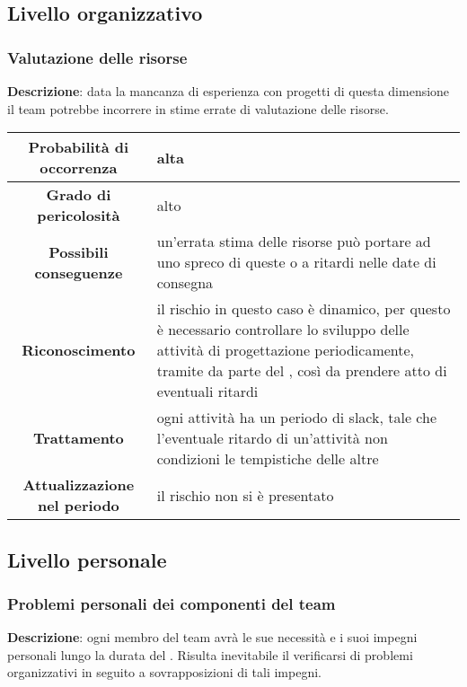 \documentclass[PianoDiProgetto.tex]{subfiles}
\begin{document}
	\subsection{Livello organizzativo}
	\subsubsection{Valutazione delle risorse}
		\label{sec:lo}
		
		\textbf{Descrizione}: data la mancanza di esperienza con progetti di questa dimensione il team potrebbe incorrere in stime errate di valutazione delle risorse.
		
		\begin{center}
			\begin{tabular}{ | c | p{10cm} |}
				\hline
				\textbf{Probabilità di occorrenza} & alta  \\ \hline
				\textbf{Grado di pericolosità} & alto \\ \hline
				\textbf{Possibili conseguenze} & un'errata stima delle risorse può portare ad uno spreco di queste o a ritardi nelle date di consegna \\ \hline
				\textbf{Riconoscimento} & il rischio in questo caso è dinamico, per questo è necessario controllare lo sviluppo delle attività di progettazione periodicamente, tramite  \gl{verifica} da parte del \RESP{}, così da prendere atto di eventuali ritardi \\ \hline
				\textbf{Trattamento} & ogni attività ha un periodo di slack, tale che l'eventuale ritardo di un'attività non condizioni le tempistiche delle altre \\ \hline
				\textbf{Attualizzazione nel periodo} &  il rischio non si è presentato \\
				\hline	
			\end{tabular}
		\end{center}	
	
	\subsection{Livello personale}
		\subsubsection{Problemi personali dei componenti del team}
			\label{sec:ppdct}
		
		\textbf{Descrizione}: ogni membro del team avrà le sue necessità e i suoi impegni personali lungo la durata del . Risulta inevitabile il verificarsi di problemi organizzativi in seguito a sovrapposizioni di tali impegni.
			
\end{document}
